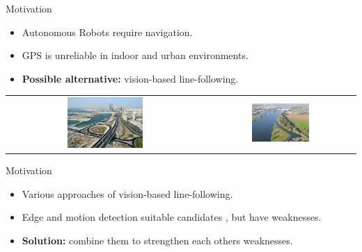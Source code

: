 \documentclass{beamer}
\begin{document}
\begin{frame}
\begin{block}{Motivation}
\begin{itemize}
\item Autonomous Robots require navigation.
\item GPS is unreliable in indoor and urban environments.
\item \textbf{Possible alternative:} vision-based line-following.
\end{itemize}
\end{block}
\begin{center}
\begin{tabular}{ c c }
\includegraphics[width = 0.4\textwidth]{images/lucht_weg.jpg} & \includegraphics[width = 0.4\textwidth]{images/lucht_rivier.jpg}
\end{tabular}
\end{center}
\end{frame}

\begin{frame}
\begin{block}{Motivation}
\begin{itemize}
\item Various approaches of vision-based line-following.
\item Edge and motion detection suitable candidates \cite{Bills2011, Gerke2011}, but have weaknesses.
\item \textbf{Solution:} combine them to strengthen each others weaknesses.
\end{itemize}
\end{block}
\end{frame}
\end{document}
